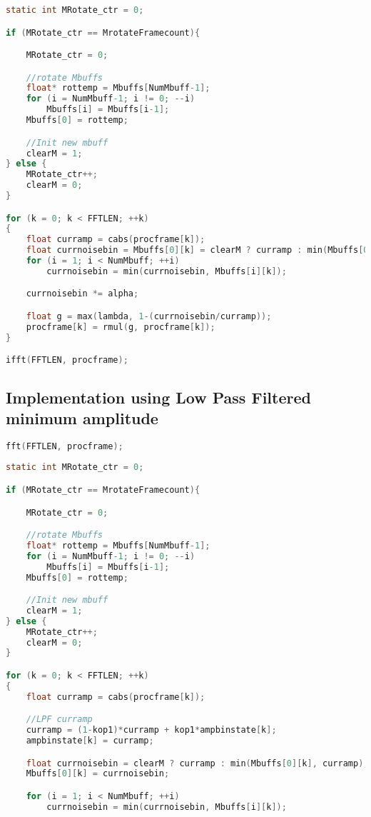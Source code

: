 \documentclass[11pt]{article} %
\begin{document}
{\begin{center}
\begin{lstlisting}[language = C]
static int MRotate_ctr = 0;

if (MRotate_ctr == MrotateFramecount){

	MRotate_ctr = 0;

	//rotate Mbuffs
	float* rottemp = Mbuffs[NumMbuff-1];
	for (i = NumMbuff-1; i != 0; --i)
		Mbuffs[i] = Mbuffs[i-1];
	Mbuffs[0] = rottemp;

	//Init new mbuff
	clearM = 1;
} else {
	MRotate_ctr++;
	clearM = 0;
}

for (k = 0; k < FFTLEN; ++k)
{
	float curramp = cabs(procframe[k]); 
	float currnoisebin = Mbuffs[0][k] = clearM ? curramp : min(Mbuffs[0][k], curramp);
	for (i = 1; i < NumMbuff; ++i)
		currnoisebin = min(currnoisebin, Mbuffs[i][k]);

	currnoisebin *= alpha;

	float g = max(lambda, 1-(currnoisebin/curramp));
	procframe[k] = rmul(g, procframe[k]);
}

ifft(FFTLEN, procframe);

    \end{lstlisting}
  \end{center}

 \subsection{Implementation using Low Pass Filtered minimum amplitude} %
 \label{sub:implementation_using_low_pass_filtered_minimum_amplitude}
 \begin{center}
 	\begin{lstlisting}[language = C]
fft(FFTLEN, procframe);
									
static int MRotate_ctr = 0;

if (MRotate_ctr == MrotateFramecount){

	MRotate_ctr = 0;

	//rotate Mbuffs
	float* rottemp = Mbuffs[NumMbuff-1];
	for (i = NumMbuff-1; i != 0; --i)
		Mbuffs[i] = Mbuffs[i-1];
	Mbuffs[0] = rottemp;

	//Init new mbuff
	clearM = 1;
} else {
	MRotate_ctr++;
	clearM = 0;
}

for (k = 0; k < FFTLEN; ++k)
{
	float curramp = cabs(procframe[k]); 

	//LPF curramp
	curramp = (1-kop1)*curramp + kop1*ampbinstate[k];
	ampbinstate[k] = curramp;

	float currnoisebin = clearM ? curramp : min(Mbuffs[0][k], curramp);
	Mbuffs[0][k] = currnoisebin;

	for (i = 1; i < NumMbuff; ++i)
		currnoisebin = min(currnoisebin, Mbuffs[i][k]);


\end{lstlisting}
\end{center}}
\end{document}
